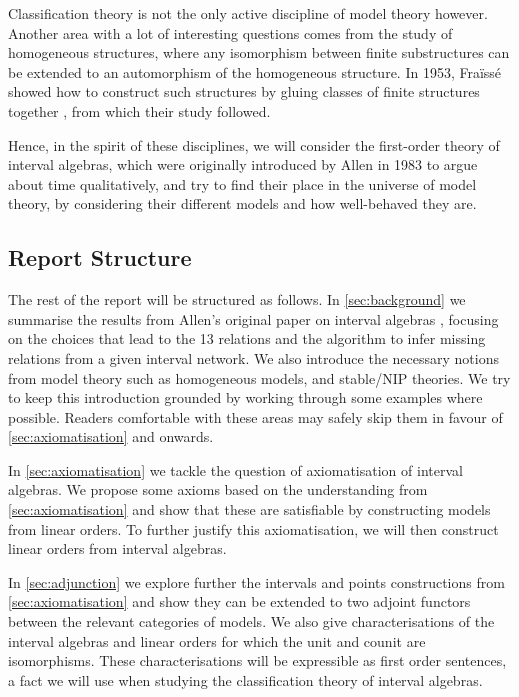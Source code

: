 Classification theory is not the only active discipline of model theory however. Another
area with a lot of interesting questions comes from the study of homogeneous structures,
where any isomorphism between finite substructures can be extended to an automorphism of
the homogeneous structure. In 1953, Fraïssé showed how to construct such structures
by gluing classes of finite structures together \cite{fraisse1953certaines},
from which their study followed.

Hence, in the spirit of these disciplines, we will consider the first-order theory of
interval algebras, which were originally introduced by Allen in 1983 to argue about time
qualitatively, and try to find their place in the universe of model
theory, by considering their different models and how well-behaved they are.

\subsection{Report Structure}%
\label{sub:report_structure}

The rest of the report will be structured as follows. In
\cref{sec:background} we summarise the results from Allen's original paper
on interval algebras \cite{allen83}, focusing on the choices that lead to
the 13 relations and the algorithm to infer missing relations from a given
interval network. We also introduce the necessary notions from model theory
such as homogeneous models, and stable/NIP theories. We try to keep this
introduction grounded by working through some examples where possible.
Readers comfortable with these areas may safely skip them in favour of
\cref{sec:axiomatisation} and onwards.

In \cref{sec:axiomatisation} we tackle the question of axiomatisation of
interval algebras. We propose some axioms based on the understanding from
\cref{sec:axiomatisation} and show that these are satisfiable by
constructing models from linear orders. To further justify this
axiomatisation, we will then construct linear orders from interval
algebras.

In \cref{sec:adjunction} we explore further the intervals and points
constructions from \cref{sec:axiomatisation} and show they can be extended to two adjoint
functors between the relevant categories of models. We also give characterisations of
the interval algebras and linear orders for which the unit and counit are isomorphisms.
These characterisations will be expressible as first order sentences, a fact we will use
when studying the classification theory of interval algebras.

